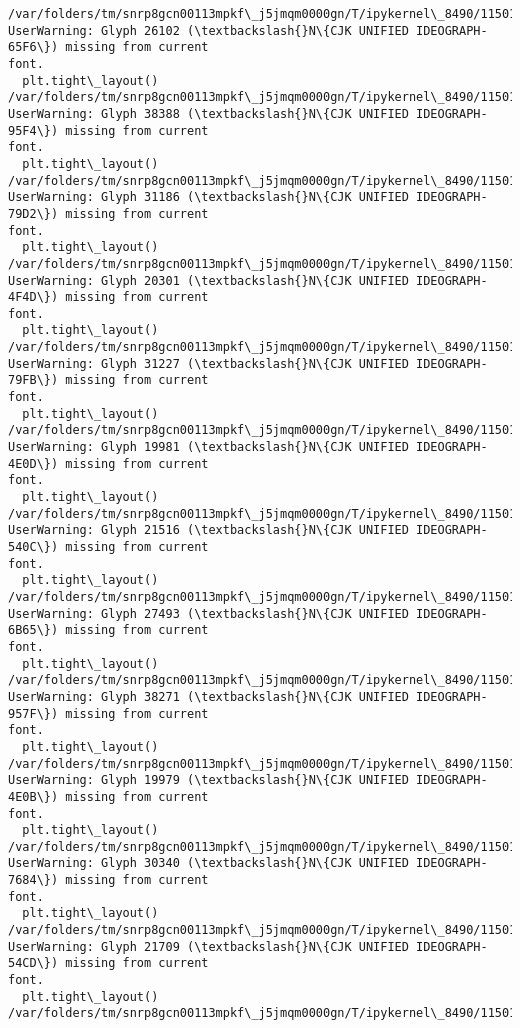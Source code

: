 \documentclass[11pt]{article}
\begin{document}
    \begin{Verbatim}[commandchars=\\\{\}]
/var/folders/tm/snrp8gcn00113mpkf\_j5jmqm0000gn/T/ipykernel\_8490/11501908.py:46:
UserWarning: Glyph 26102 (\textbackslash{}N\{CJK UNIFIED IDEOGRAPH-65F6\}) missing from current
font.
  plt.tight\_layout()
/var/folders/tm/snrp8gcn00113mpkf\_j5jmqm0000gn/T/ipykernel\_8490/11501908.py:46:
UserWarning: Glyph 38388 (\textbackslash{}N\{CJK UNIFIED IDEOGRAPH-95F4\}) missing from current
font.
  plt.tight\_layout()
/var/folders/tm/snrp8gcn00113mpkf\_j5jmqm0000gn/T/ipykernel\_8490/11501908.py:46:
UserWarning: Glyph 31186 (\textbackslash{}N\{CJK UNIFIED IDEOGRAPH-79D2\}) missing from current
font.
  plt.tight\_layout()
/var/folders/tm/snrp8gcn00113mpkf\_j5jmqm0000gn/T/ipykernel\_8490/11501908.py:46:
UserWarning: Glyph 20301 (\textbackslash{}N\{CJK UNIFIED IDEOGRAPH-4F4D\}) missing from current
font.
  plt.tight\_layout()
/var/folders/tm/snrp8gcn00113mpkf\_j5jmqm0000gn/T/ipykernel\_8490/11501908.py:46:
UserWarning: Glyph 31227 (\textbackslash{}N\{CJK UNIFIED IDEOGRAPH-79FB\}) missing from current
font.
  plt.tight\_layout()
/var/folders/tm/snrp8gcn00113mpkf\_j5jmqm0000gn/T/ipykernel\_8490/11501908.py:46:
UserWarning: Glyph 19981 (\textbackslash{}N\{CJK UNIFIED IDEOGRAPH-4E0D\}) missing from current
font.
  plt.tight\_layout()
/var/folders/tm/snrp8gcn00113mpkf\_j5jmqm0000gn/T/ipykernel\_8490/11501908.py:46:
UserWarning: Glyph 21516 (\textbackslash{}N\{CJK UNIFIED IDEOGRAPH-540C\}) missing from current
font.
  plt.tight\_layout()
/var/folders/tm/snrp8gcn00113mpkf\_j5jmqm0000gn/T/ipykernel\_8490/11501908.py:46:
UserWarning: Glyph 27493 (\textbackslash{}N\{CJK UNIFIED IDEOGRAPH-6B65\}) missing from current
font.
  plt.tight\_layout()
/var/folders/tm/snrp8gcn00113mpkf\_j5jmqm0000gn/T/ipykernel\_8490/11501908.py:46:
UserWarning: Glyph 38271 (\textbackslash{}N\{CJK UNIFIED IDEOGRAPH-957F\}) missing from current
font.
  plt.tight\_layout()
/var/folders/tm/snrp8gcn00113mpkf\_j5jmqm0000gn/T/ipykernel\_8490/11501908.py:46:
UserWarning: Glyph 19979 (\textbackslash{}N\{CJK UNIFIED IDEOGRAPH-4E0B\}) missing from current
font.
  plt.tight\_layout()
/var/folders/tm/snrp8gcn00113mpkf\_j5jmqm0000gn/T/ipykernel\_8490/11501908.py:46:
UserWarning: Glyph 30340 (\textbackslash{}N\{CJK UNIFIED IDEOGRAPH-7684\}) missing from current
font.
  plt.tight\_layout()
/var/folders/tm/snrp8gcn00113mpkf\_j5jmqm0000gn/T/ipykernel\_8490/11501908.py:46:
UserWarning: Glyph 21709 (\textbackslash{}N\{CJK UNIFIED IDEOGRAPH-54CD\}) missing from current
font.
  plt.tight\_layout()
/var/folders/tm/snrp8gcn00113mpkf\_j5jmqm0000gn/T/ipykernel\_8490/11501908.py:46:

\end{Verbatim}
\end{document}
